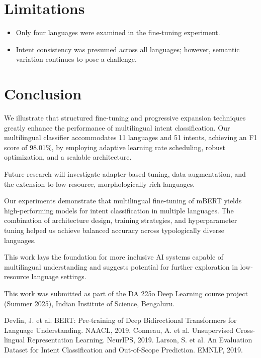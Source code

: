 \documentclass{ecai}
\begin{document}
\section{Limitations}
\begin{itemize}
    \item Only four languages were examined in the fine-tuning experiment.
    \item Intent consistency was presumed across all languages; however, semantic variation continues to pose a challenge.
\end{itemize}

\section{Conclusion}
We illustrate that structured fine-tuning and progressive expansion techniques greatly enhance the performance of multilingual intent classification. Our multilingual classifier accommodates 11 languages and 51 intents, achieving an F1 score of 98.01\%, by employing adaptive learning rate scheduling, robust optimization, and a scalable architecture.

Future research will investigate adapter-based tuning, data augmentation, and the extension to low-resource, morphologically rich languages.

Our experiments demonstrate that multilingual fine-tuning of mBERT yields high-performing models for intent classification in multiple languages. The combination of architecture design, training strategies, and hyperparameter tuning helped us achieve balanced accuracy across typologically diverse languages.

This work lays the foundation for more inclusive AI systems capable of multilingual understanding and suggests potential for further exploration in low-resource language settings.

\ack This work was submitted as part of the DA 225o Deep Learning course project (Summer 2025), Indian Institute of Science, Bengaluru.


\begin{thebibliography}{}
 Devlin, J. et al. BERT: Pre-training of Deep Bidirectional Transformers for Language Understanding. NAACL, 2019.
 Conneau, A. et al. Unsupervised Cross-lingual Representation Learning. NeurIPS, 2019.
 Larson, S. et al. An Evaluation Dataset for Intent Classification and Out-of-Scope Prediction. EMNLP, 2019.
\end{thebibliography}
\end{document}
